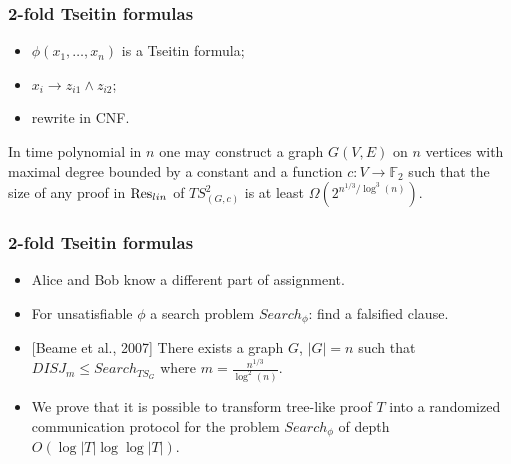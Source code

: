 \begin{frame}
    \frametitle{2-fold Tseitin formulas}

    \begin{itemize}
        \item $\phi(x_1, \dots, x_n)$ is a Tseitin formula;
        \item $x_i \to z_{i1} \land z_{i2}$;
    	\item rewrite in CNF.
	\end{itemize}

	\pause
    \begin{theorem}
        In time polynomial in $n$ one may construct a graph $G(V, E)$ on $n$ vertices with maximal degree bounded by a
        constant and a function $c: V \to \mathbb{F}_2$ such that the size of any  proof in
        $\mathrm{Res}_{lin}$ of $TS^2_{(G,c)}$ is at least $\Omega\left(2^{n^{1 / 3} / \log^3(n)} \right)$.
    \end{theorem}
\end{frame}

\begin{frame}
    \frametitle{2-fold Tseitin formulas}
    
    \begin{itemize}
        \item Alice and Bob know a different part of assignment.
        \pause
		\item For unsatisfiable $\phi$ a search problem $Search_\phi$: find a falsified clause.
        \pause
        \item{} [Beame et al., 2007] There exists a graph $G$, $|G| = n$ such that $DISJ_{m} \le Search_{TS_{G}}$
			where $m = \frac{n^{1 / 3}}{\log^2(n)}$.
		\item We prove that it is possible to transform tree-like proof $T$ into a randomized communication protocol for
			the problem $Search_\phi$ of depth $O(\log |T| \log\log |T|)$.
        \pause
	\end{itemize}
\end{frame}




